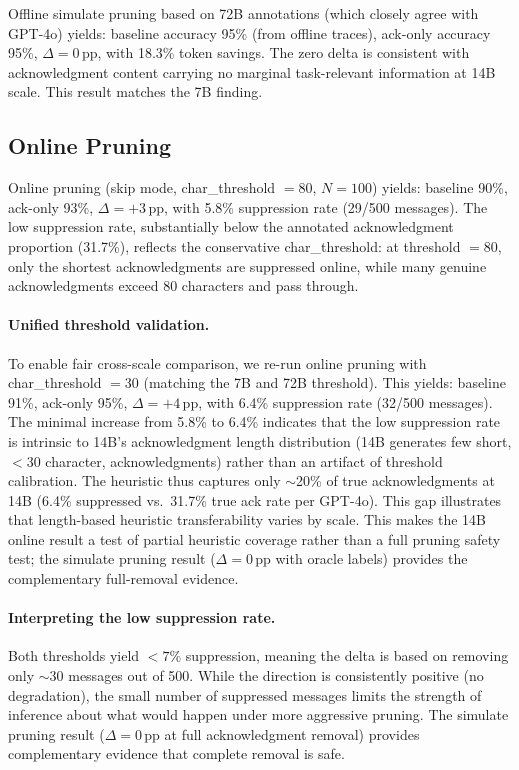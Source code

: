 Offline simulate pruning based on 72B annotations (which closely agree with GPT-4o) yields: baseline accuracy 95\% (from offline traces), ack-only accuracy 95\%, $\Delta = 0$\,pp, with 18.3\% token savings. The zero delta is consistent with acknowledgment content carrying no marginal task-relevant information at 14B scale. This result matches the 7B finding.

\subsection{Online Pruning}

Online pruning (skip mode, char\_threshold $= 80$, $N = 100$) yields: baseline 90\%, ack-only 93\%, $\Delta = +3$\,pp, with 5.8\% suppression rate (29/500 messages). The low suppression rate, substantially below the annotated acknowledgment proportion (31.7\%), reflects the conservative char\_threshold: at threshold $= 80$, only the shortest acknowledgments are suppressed online, while many genuine acknowledgments exceed 80 characters and pass through.

\paragraph{Unified threshold validation.} To enable fair cross-scale comparison, we re-run online pruning with char\_threshold $= 30$ (matching the 7B and 72B threshold). This yields: baseline 91\%, ack-only 95\%, $\Delta = +4$\,pp, with 6.4\% suppression rate (32/500 messages). The minimal increase from 5.8\% to 6.4\% indicates that the low suppression rate is intrinsic to 14B's acknowledgment length distribution (14B generates few short, $< 30$ character, acknowledgments) rather than an artifact of threshold calibration. The heuristic thus captures only ${\sim}$20\% of true acknowledgments at 14B (6.4\% suppressed vs.\ 31.7\% true ack rate per GPT-4o). This gap illustrates that length-based heuristic transferability varies by scale. This makes the 14B online result a test of partial heuristic coverage rather than a full pruning safety test; the simulate pruning result ($\Delta = 0$\,pp with oracle labels) provides the complementary full-removal evidence.

\paragraph{Interpreting the low suppression rate.} Both thresholds yield $< 7\%$ suppression, meaning the delta is based on removing only ${\sim}30$ messages out of 500. While the direction is consistently positive (no degradation), the small number of suppressed messages limits the strength of inference about what would happen under more aggressive pruning. The simulate pruning result ($\Delta = 0$\,pp at full acknowledgment removal) provides complementary evidence that complete removal is safe.

